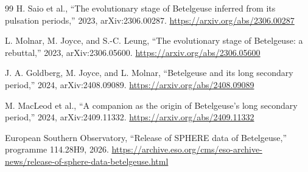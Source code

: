 \documentclass[11pt,a4paper]{article}
\begin{document}
\begin{thebibliography}{99}
H. Saio et al., ``The evolutionary stage of Betelgeuse inferred from its pulsation periods,'' 2023, arXiv:2306.00287. \url{https://arxiv.org/abs/2306.00287}

L. Molnar, M. Joyce, and S.-C. Leung, ``The evolutionary stage of Betelgeuse: a rebuttal,'' 2023, arXiv:2306.05600. \url{https://arxiv.org/abs/2306.05600}

J. A. Goldberg, M. Joyce, and L. Molnar, ``Betelgeuse and its long secondary period,'' 2024, arXiv:2408.09089. \url{https://arxiv.org/abs/2408.09089}

M. MacLeod et al., ``A companion as the origin of Betelgeuse's long secondary period,'' 2024, arXiv:2409.11332. \url{https://arxiv.org/abs/2409.11332}

European Southern Observatory, ``Release of SPHERE data of Betelgeuse,'' programme 114.28H9, 2026. \url{https://archive.eso.org/cms/eso-archive-news/release-of-sphere-data-betelgeuse.html}

\end{thebibliography}
\end{document}
